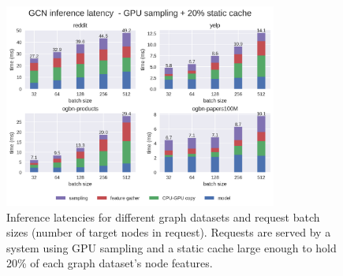 

\begin{figure}[h!]
    \centering
    \includegraphics[width=0.8\textwidth]{figures/GCN_latency_breakdown_gpu_sampled_with_cache.png}
    
    \caption{Inference latencies for different graph datasets and request batch sizes (number of target nodes in request). Requests are served by a system using GPU sampling and a static cache large enough to hold 20\% of each graph dataset's node features.}
    \label{GPU Sampling Latency Breakdown}
\end{figure}    

